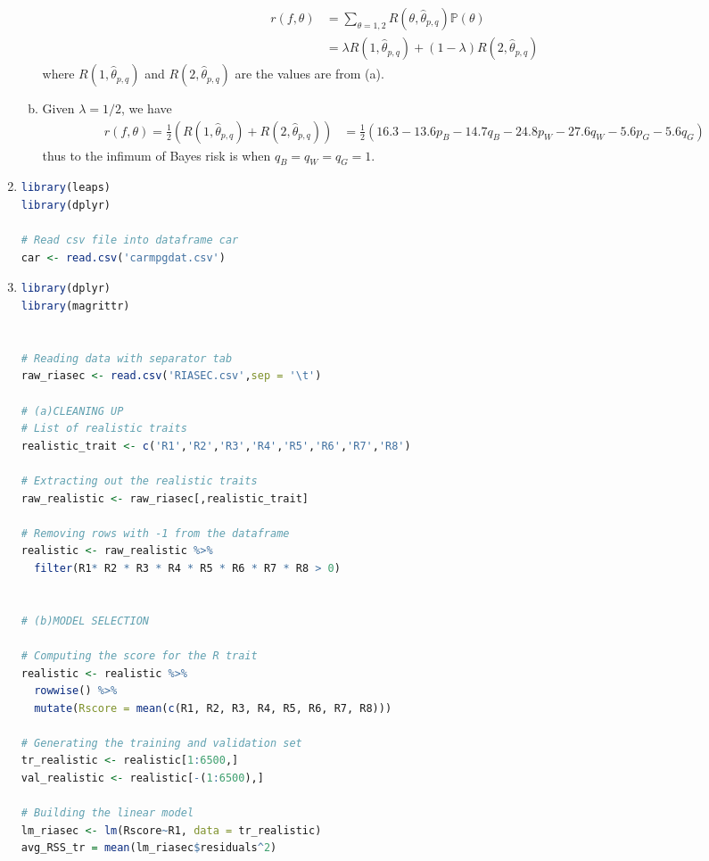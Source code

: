 \documentclass[a4paper,10pt]{article}
\theoremstyle{definition}
\begin{document}
\begin{enumerate}
\begin{enumerate}[(a)]
\begin{align*}
r(f,\theta) &= \sum_{\theta=1,2}R(\theta,\hat{\theta}_{p,q})\mathbb{P}(\theta)\\
&= \lambda R(1,\hat{\theta}_{p,q})+ (1-\lambda)R(2,\hat{\theta}_{p,q})
\end{align*}
where $R(1,\hat{\theta}_{p,q})$ and $R(2,\hat{\theta}_{p,q})$ are the values are from (a).
\item Given $\lambda = 1/2$, we have
\begin{align*}
r(f,\theta)=\frac{1}{2} \left(R(1,\hat{\theta}_{p,q})+ R(2,\hat{\theta}_{p,q})\right) &=\frac{1}{2}\left(16.3-13.6p_B-14.7q_B-24.8p_W-27.6q_W-5.6p_G-5.6q_G\right)
\end{align*}
thus to the infimum of Bayes risk is when $q_B = q_W = q_G =1$.
\end{enumerate}

\item


\begin{lstlisting}[language=R,commentstyle=\fontseries{lc}\color{gray}]
library(leaps)
library(dplyr)

# Read csv file into dataframe car
car <- read.csv('carmpgdat.csv')
\end{lstlisting}


\item
\begin{lstlisting}[language=R,commentstyle=\fontseries{lc}\color{gray}]
library(dplyr)
library(magrittr)


# Reading data with separator tab
raw_riasec <- read.csv('RIASEC.csv',sep = '\t')

# (a)CLEANING UP
# List of realistic traits
realistic_trait <- c('R1','R2','R3','R4','R5','R6','R7','R8')

# Extracting out the realistic traits
raw_realistic <- raw_riasec[,realistic_trait]

# Removing rows with -1 from the dataframe
realistic <- raw_realistic %>%
  filter(R1* R2 * R3 * R4 * R5 * R6 * R7 * R8 > 0)
  

# (b)MODEL SELECTION

# Computing the score for the R trait
realistic <- realistic %>%
  rowwise() %>%
  mutate(Rscore = mean(c(R1, R2, R3, R4, R5, R6, R7, R8))) 

# Generating the training and validation set 
tr_realistic <- realistic[1:6500,]
val_realistic <- realistic[-(1:6500),]

# Building the linear model
lm_riasec <- lm(Rscore~R1, data = tr_realistic)
avg_RSS_tr = mean(lm_riasec$residuals^2)


\end{lstlisting}
\end{enumerate}
\end{document}
